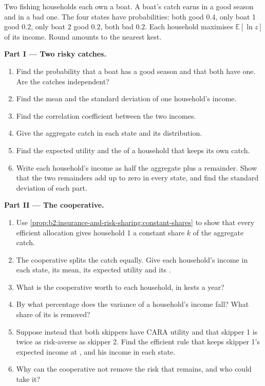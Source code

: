 \begin{problem}
\label{pb:b2:insurance-and-risk-sharing:1}
Two fishing households each own a boat. A boat's catch earns  in a good season and
 in a bad one. The four states have probabilities: both good $0.4$, only boat 1 good $0.2$,
only boat 2 good $0.2$, both bad $0.2$. Each household maximises $\mathbb{E}[\ln z]$ of its income.
Round amounts to the nearest kest.

\medskip
\noindent\textbf{Part I --- Two risky catches.}
\begin{enumerate}
  \item Find the probability that a boat has a good season and that both have one. Are the catches
        independent?
  \item Find the mean and the standard deviation of one household's income.
  \item Find the correlation coefficient between the two incomes.
  \item Give the aggregate catch in each state and its distribution.
  \item Find the expected utility and the  of a household that keeps its own catch.
  \item Write each household's income as half the aggregate plus a remainder. Show that the two
        remainders add up to zero in every state, and find the standard deviation of each part.
\end{enumerate}

\medskip
\noindent\textbf{Part II --- The cooperative.}
\begin{enumerate}[resume]
  \item Use \cref{prop:b2:insurance-and-risk-sharing:constant-shares} to show that every efficient
        allocation gives household 1 a constant share $k$ of the aggregate catch.
  \item The cooperative splits the catch equally. Give each household's income in each state, its mean,
        its expected utility and its .
  \item What is the cooperative worth to each household, in kests a year?
  \item By what percentage does the variance of a household's income fall? What share of its
         is removed?
  \item Suppose instead that both skippers have CARA utility and that skipper 1 is twice as risk-averse
        as skipper 2. Find the efficient rule that keeps skipper 1's expected income at ,
        and his income in each state.
  \item Why can the cooperative not remove the risk that remains, and who could take it?
\end{enumerate}


\end{problem}
